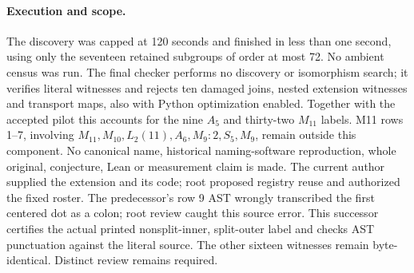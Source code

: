 \documentclass[10pt]{article}
\begin{document}
\paragraph{Execution and scope.}
The discovery was capped at 120 seconds and finished in less than one
second, using only the seventeen retained subgroups of order at most 72.
No ambient census was run. The final checker performs no discovery or
isomorphism search; it verifies literal witnesses and rejects ten damaged
joins, nested extension witnesses and transport maps, also with Python
optimization enabled. Together with the accepted pilot this accounts for
the nine $A_5$ and thirty-two $M_{11}$ labels. M11 rows 1--7, involving
$M_{11},M_{10},L_2(11),A_6,M_9:2,S_5,M_9$, remain outside this component.
No canonical name, historical naming-software reproduction, whole original,
conjecture, Lean or measurement claim is made. The current author supplied
the extension and its code; root proposed registry reuse and authorized
the fixed roster. The predecessor's row 9 AST wrongly transcribed the first centered dot as a colon; root review caught this source error. This successor certifies the actual printed nonsplit-inner, split-outer label and checks AST punctuation against the literal source. The other sixteen witnesses remain byte-identical. Distinct review remains required.
\end{document}
